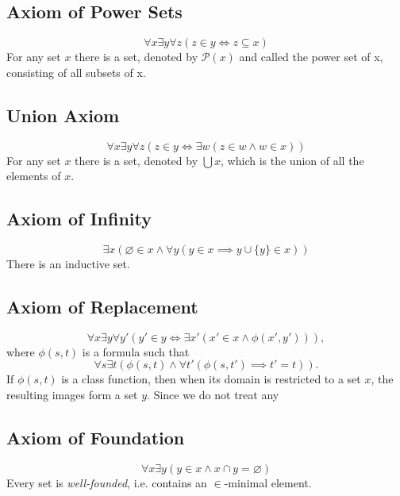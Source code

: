 \documentclass[../../main.tex]{subfiles}
\begin{document}
\subsection{Axiom of Power Sets}
$$\forall x \exists y \forall z \left(z \in y \iff z \subseteq x\right)$$
For any set $x$ there is a set, denoted by $\mathcal{P}(x)$ and called the power set of x, consisting of all subsets of x.

\subsection{Union Axiom}
$$\forall x \exists y \forall z \left(z \in y \iff \exists w \left(z \in w \wedge w \in x\right)\right)$$
For any set $x$ there is a set, denoted by $\bigcup x$, which is the union of all the elements of $x$.

\subsection{Axiom of Infinity} \label{ZF7}
$$\exists x \left(\varnothing \in x \wedge \forall y \left(y \in x \implies y \cup \{y\} \in x \right)\right)$$
There is an inductive set.

\subsection{Axiom of Replacement}
$$\forall x \exists y \forall y' \left(y' \in y \iff \exists x' \left(x' \in x \wedge \phi(x', y')\right)\right),$$
where $\phi(s, t)$ is a formula such that 
$$\forall s \exists t \left(\phi(s, t) \wedge \forall t' \left(\phi(s, t') \implies t' = t\right)\right).$$
If $\phi(s, t)$ is a class function, then when its domain is restricted to a set $x$, the resulting images form a set $y$.
Since we do not treat any 

\subsection{Axiom of Foundation}
$$\forall x \exists y \left(y \in x \wedge x \cap y = \varnothing \right)$$
Every set is \textit{well-founded}, i.e. contains an $\in$-minimal element.
\end{document}
